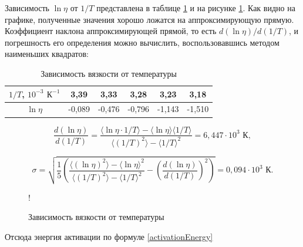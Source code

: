 \documentclass[a4paper,12pt]{article} %
\begin{document}
Зависимость $\ln{\eta}$ от $1/T$ представлена в таблице \ref{tab:graphData} и на рисунке \ref{graph}. Как видно на графике, полученные значения хорошо ложатся на аппроксимирующую прямую. Коэффициент наклона аппроксимирующей прямой, то есть $d(\ln \eta)/d(1/T)$, и погрешность его определения можно вычислить, воспользовавшись методом наименьших квадратов:

\begin{table}[]
    \centering
    \begin{tabular}{|c|c|c|c|c|c|} \hline
        $1/T$, $10^{-3}$ $\text{К}^{-1}$ & 3,39 & 3,33 & 3,28 & 3,23 & 3,18 \\ \hline
        $\ln{\eta}$ & -0,089 & -0,476 & -0,796 & -1,143 & -1,510 \\ \hline
    \end{tabular}
    \caption{Зависимость вязкости от температуры}
    \label{tab:graphData}
\end{table}

\begin{equation}
    \frac{d(\ln \eta)}{d(1/T)} = \frac{\langle \ln{\eta}\cdot 1/T\rangle-\langle \ln{\eta}\rangle \langle 1/T\rangle}{\langle (1/T)^2\rangle - \langle 1/T\rangle^2} = 6,447 \cdot 10^3 \text{ К},
\end{equation}

\begin{equation}
    \sigma = \sqrt{\frac{1}{5}\left(\frac{\langle (\ln{\eta})^2 \rangle - \langle \ln{\eta} \rangle^2}{\langle (1/T)^2 \rangle - \langle 1/T \rangle^2} - (\frac{d(\ln \eta)}{d(1/T)})^2 \right) } = 0,094 \cdot 10^3 \text{ К}.
\end{equation}

\begin{figure}
\centering
{} {!} {
}
\caption{Зависимость вязкости от температуры}
\label{graph}
\end{figure}

Отсюда энергия активации по формуле \eqref{activationEnergy}
\end{document}
